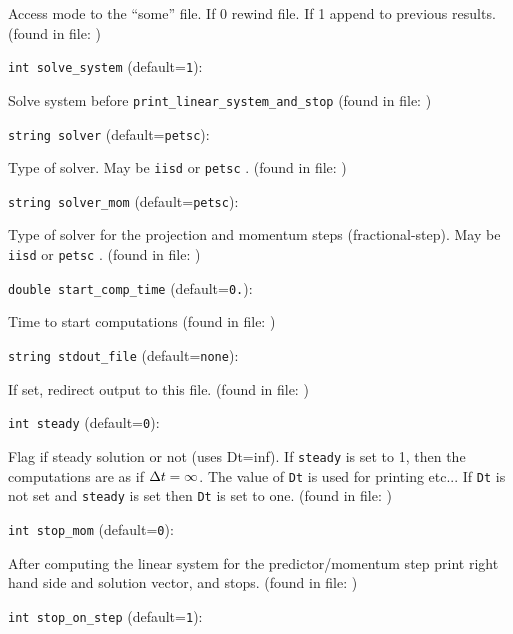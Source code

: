 Access mode to the ``some'' file. If 0 rewind file. If 1 
 append to previous  results.
 (found in file: \verb++)
\item\verb+int solve_system+ {\rm(default=\verb|1|)}:

Solve system before  \verb+print_linear_system_and_stop+ 
 (found in file: \verb++)
\item\verb+string solver+ {\rm(default=\verb|petsc|)}:

Type of solver. May be  \verb+iisd+  or  \verb+petsc+ . 
 (found in file: \verb++)
\item\verb+string solver_mom+ {\rm(default=\verb|petsc|)}:

Type of solver for the projection and momentum steps
(fractional-step). May be  \verb+iisd+  or  \verb+petsc+ .
 (found in file: \verb++)
\item\verb+double start_comp_time+ {\rm(default=\verb|0.|)}:

Time to start computations
 (found in file: \verb++)
\item\verb+string stdout_file+ {\rm(default=\verb|none|)}:

If set, redirect output to this file.
 (found in file: \verb++)
\item\verb+int steady+ {\rm(default=\verb|0|)}:

Flag if steady solution or not (uses Dt=inf). If  \verb+steady+ 
is set to 1, then the computations are as if ${\Delta t}=\infty$. 
The value of  \verb+Dt+  is used for printing etc... If  \verb+Dt+ 
is not set and  \verb+steady+  is set then  \verb+Dt+  is set to one.
 (found in file: \verb++)
\item\verb+int stop_mom+ {\rm(default=\verb|0|)}:

After computing the linear system for the
 predictor/momentum step print right hand side
 and solution vector, and stops.
 (found in file: \verb++)
\item\verb+int stop_on_step+ {\rm(default=\verb|1|)}:

